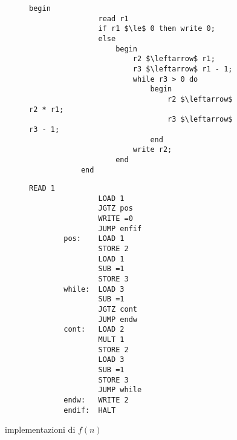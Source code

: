 \documentclass{subfiles}
\begin{document}
\begin{figure}[!h]
    \begin{subfigure}[b]{0.45\textwidth}
        \begin{lstlisting}[language = algol]
            begin
                read r1
                if r1 $\le$ 0 then write 0;
                else
                    begin
                        r2 $\leftarrow$ r1;
                        r3 $\leftarrow$ r1 - 1;
                        while r3 > 0 do
                            begin
                                r2 $\leftarrow$ r2 * r1;
                                r3 $\leftarrow$ r3 - 1;
                            end
                        write r2;
                    end
            end
        \end{lstlisting}
    \end{subfigure}
    \hspace{12pt}
    \begin{subfigure}[b]{0.45\textwidth}
        \begin{lstlisting}[language = RAM]
                READ 1
                LOAD 1
                JGTZ pos
                WRITE =0
                JUMP enfif
        pos:    LOAD 1
                STORE 2
                LOAD 1
                SUB =1
                STORE 3
        while:  LOAD 3
                SUB =1
                JGTZ cont
                JUMP endw
        cont:   LOAD 2
                MULT 1
                STORE 2
                LOAD 3
                SUB =1
                STORE 3
                JUMP while
        endw:   WRITE 2
        endif:  HALT     
    \end{lstlisting}
    \end{subfigure}
    \caption{implementazioni di \(f(n)\)}
    \label{Fig:2}
\end{figure}
\end{document}
